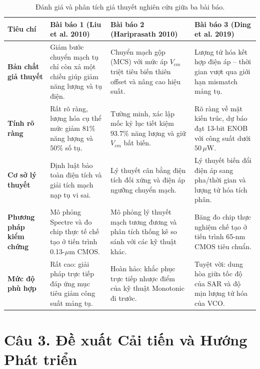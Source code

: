 \documentclass[12pt,a4paper]{article}
\begin{document}
\begin{table}[H]
\centering
\small
\setlength{\tabcolsep}{5pt}
\caption{Đánh giá và phân tích giả thuyết nghiên cứu giữa ba bài báo.}
\label{tab:ss_cau2}
\begin{tabularx}{\textwidth}{>{\RaggedRight}p{2.6cm} >{\RaggedRight}X >{\RaggedRight}p{3.8cm} >{\RaggedRight}p{3.5cm}}
\toprule
\textbf{Tiêu chí} & \textbf{Bài báo 1 (Liu et al. 2010)} & \textbf{Bài báo 2 (Hariprasath 2010)} & \textbf{Bài báo 3 (Ding et al. 2019)} \\
\midrule
\textbf{Bản chất giả thuyết} & Giảm bước chuyển mạch tụ chỉ còn xả một chiều giúp giảm năng lượng và tụ điện. & Chuyển mạch gộp (MCS) với mức áp $V_{cm}$ triệt tiêu biến thiên offset và nâng cao hiệu suất. & Lượng tử hóa kết hợp điện áp -- thời gian vượt qua giới hạn mismatch mảng tụ. \\
\addlinespace
\textbf{Tính rõ ràng} & Rất rõ ràng, lượng hóa cụ thể mức giảm $81\%$ năng lượng và $50\%$ số tụ. & Tường minh, xác lập mốc kỷ lục tiết kiệm $93.7\%$ năng lượng và giữ $V_{cm}$ bất biến. & Rõ ràng về mặt kiến trúc, dự báo đạt 13-bit ENOB với công suất dưới $50\,\mu\text{W}$. \\
\addlinespace
\textbf{Cơ sở lý thuyết} & Định luật bảo toàn điện tích và giải tích mạch nạp tụ vi sai. & Lý thuyết cân bằng điện tích đối xứng và điện áp ngưỡng chuyển mạch. & Lý thuyết biến đổi điện áp sang pha/thời gian và lượng tử hóa tích phân. \\
\addlinespace
\textbf{Phương pháp kiểm chứng} & Mô phỏng Spectre và đo chip thực tế chế tạo ở tiến trình 0.13-$\mu$m CMOS. & Mô phỏng lý thuyết mạch tương đương và phân tích thống kê so sánh với các kỹ thuật khác. & Băng đo chip thực nghiệm chế tạo ở tiến trình 65-nm CMOS tiêu chuẩn. \\
\addlinespace
\textbf{Mức độ phù hợp} & Rất cao: giải pháp trực tiếp đáp ứng mục tiêu giảm công suất mảng tụ. & Hoàn hảo: khắc phục trực tiếp nhược điểm của kỹ thuật Monotonic đi trước. & Tuyệt vời: dung hòa giữa tốc độ của SAR và độ mịn lượng tử hóa của VCO. \\
\bottomrule
\end{tabularx}
\end{table}

\section{Câu 3. Đề xuất Cải tiến và Hướng Phát triển}
\end{document}
